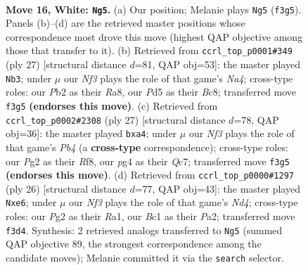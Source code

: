 \documentclass[11pt]{article}
\begin{document}
\clearpage

\begin{figure}[p]\centering
\begin{subfigure}{0.46\textwidth}\centering
\resizebox{\linewidth}{!}{%
\newchessgame
\chessboard[
  setfen={rnbqk2r/4b3/p2p4/1ppPpp2/6p1/1B1P1N2/PPPQ1PP1/R1B1RK2 w kq - 0 16},
  showmover=false,
  pgfstyle=straightmove, color=movearrow, markmove={f3-g5}
]}
\caption{}
\end{subfigure}\hfill
\begin{subfigure}{0.46\textwidth}\centering
\resizebox{\linewidth}{!}{%
\newchessgame
\chessboard[
  setfen={r1bq1rk1/p4ppp/1p2pb2/n7/1PpPN3/P3P3/2B2PPP/R1BQK2R b KQ - 1 14},
  showmover=false,
  pgfstyle=straightmove, color=movearrow, markmove={a5-b3}
]}
\caption{}
\end{subfigure}
\\[4pt]
\begin{subfigure}{0.46\textwidth}\centering
\resizebox{\linewidth}{!}{%
\newchessgame
\chessboard[
  setfen={r1b2rk1/1pq3pp/2pbpn2/1p3p2/PP1P4/3NP2P/4BPP1/R1BQ1RK1 b - - 1 14},
  showmover=false,
  pgfstyle=straightmove, color=movearrow, markmove={b5-a4}
]}
\caption{}
\end{subfigure}\hfill
\begin{subfigure}{0.46\textwidth}\centering
\resizebox{\linewidth}{!}{%
\newchessgame
\chessboard[
  setfen={r3k2r/3qbppp/p3b3/npppP3/3N4/1BP1B3/PP1Q1PPP/R4RK1 w kq - 0 14},
  showmover=false,
  pgfstyle=straightmove, color=movearrow, markmove={d4-e6}
]}
\caption{}
\end{subfigure}
\caption{\textbf{Move 16, White: \texttt{Ng5}.} (a) Our position; Melanie plays \texttt{Ng5} (\texttt{f3g5}). Panels (b)--(d) are the retrieved master positions whose correspondence most drove this move (highest QAP objective among those that transfer to it). (b) Retrieved from \texttt{ccrl\_top\_p0001\#349} (ply 27) [structural distance $d$=81, QAP obj=53]: the master played \texttt{Nb3}; under $\mu$ our \emph{Nf3} plays the role of that game's \emph{Na4}; cross-type roles: our \emph{P}b2 as their \emph{R}a8, our \emph{P}d5 as their \emph{B}c8; transferred move \texttt{f3g5} \textbf{(endorses this move)}. (c) Retrieved from \texttt{ccrl\_top\_p0002\#2308} (ply 27) [structural distance $d$=78, QAP obj=36]: the master played \texttt{bxa4}; under $\mu$ our \emph{Nf3} plays the role of that game's \emph{Pb4} (a \textbf{cross-type} correspondence); cross-type roles: our \emph{P}g2 as their \emph{R}f8, our \emph{p}g4 as their \emph{Q}c7; transferred move \texttt{f3g5} \textbf{(endorses this move)}. (d) Retrieved from \texttt{ccrl\_top\_p0000\#1297} (ply 26) [structural distance $d$=77, QAP obj=43]: the master played \texttt{Nxe6}; under $\mu$ our \emph{Nf3} plays the role of that game's \emph{Nd4}; cross-type roles: our \emph{P}g2 as their \emph{R}a1, our \emph{B}c1 as their \emph{P}a2; transferred move \texttt{f3d4}. Synthesis: 2 retrieved analogs transferred to \texttt{Ng5} (summed QAP objective 89, the strongest correspondence among the candidate moves); Melanie committed it via the \texttt{search} selector.}
\label{fig:thought-m30}
\end{figure}
\end{document}
